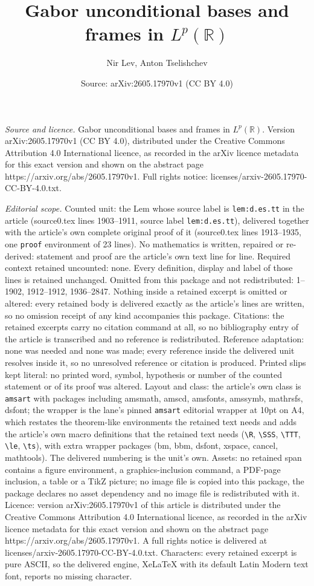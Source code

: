 \documentclass[10pt,a4paper]{amsart}
\title[Gabor unconditional bases and frames in $L^p(\mathbb{R})$]{Gabor unconditional bases and frames in $L^p(\mathbb{R})$}
\author{Nir Lev, Anton Tselishchev}
\date{Source: arXiv:2605.17970v1 (CC BY 4.0)}
\begin{document}
\maketitle

\noindent\emph{Source and licence.} Gabor unconditional bases and frames in $L^p(\mathbb{R})$. Version arXiv:2605.17970v1 (CC BY 4.0), distributed under the Creative Commons Attribution 4.0 International licence, as recorded in the arXiv licence metadata for this exact version and shown on the abstract page https://arxiv.org/abs/2605.17970v1. Full rights notice: licenses/arxiv-2605.17970-CC-BY-4.0.txt.\par\smallskip

\noindent\textit{Editorial scope.} Counted unit: the Lem whose source label is \texttt{lem:d.es.tt} in the article (source0.tex lines 1903--1911, source label \texttt{lem:d.es.tt}), delivered together with the article's own complete original proof of it (source0.tex lines 1913--1935, one \texttt{proof} environment of 23 lines). No mathematics is written, repaired or re-derived: statement and proof are the article's own text line for line. Required context retained uncounted: none. Every definition, display and label of those lines is retained unchanged. Omitted from this package and not redistributed: 1--1902, 1912--1912, 1936--2847. Nothing inside a retained excerpt is omitted or altered: every retained body is delivered exactly as the article's lines are written, so no omission receipt of any kind accompanies this package. Citations: the retained excerpts carry no citation command at all, so no bibliography entry of the article is transcribed and no reference is redistributed. Reference adaptation: none was needed and none was made; every reference inside the delivered unit resolves inside it, so no unresolved reference or citation is produced. Printed slips kept literal: no printed word, symbol, hypothesis or number of the counted statement or of its proof was altered. Layout and class: the article's own class is \texttt{amsart} with packages including amsmath, amscd, amsfonts, amssymb, mathrsfs, dsfont; the wrapper is the lane's pinned \texttt{amsart} editorial wrapper at 10pt on A4, which restates the theorem-like environments the retained text needs and adds the article's own macro definitions that the retained text needs (\texttt{\textbackslash R}, \texttt{\textbackslash SSS}, \texttt{\textbackslash TTT}, \texttt{\textbackslash le}, \texttt{\textbackslash ts}), with extra wrapper packages (bm, bbm, dsfont, xspace, cancel, mathtools). The delivered numbering is the unit's own. Assets: no retained span contains a figure environment, a graphics-inclusion command, a PDF-page inclusion, a table or a TikZ picture; no image file is copied into this package, the package declares no asset dependency and no image file is redistributed with it. Licence: version arXiv:2605.17970v1 of this article is distributed under the Creative Commons Attribution 4.0 International licence, as recorded in the arXiv licence metadata for this exact version and shown on the abstract page https://arxiv.org/abs/2605.17970v1. A full rights notice is delivered at licenses/arxiv-2605.17970-CC-BY-4.0.txt. Characters: every retained excerpt is pure ASCII, so the delivered engine, XeLaTeX with its default Latin Modern text font, reports no missing character.
\end{document}
